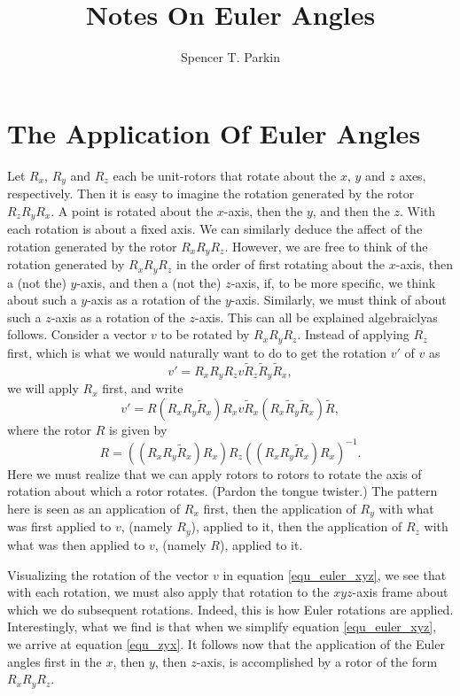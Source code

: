 \documentclass[12pt]{article}
\title{Notes On Euler Angles}
\author{Spencer T. Parkin}
\begin{document}
\maketitle

\section*{The Application Of Euler Angles}

Let $R_x$, $R_y$ and $R_z$ each be unit-rotors that rotate about the $x$, $y$ and $z$ axes, respectively.
Then it is easy to imagine the rotation generated by the rotor $R_zR_yR_x$.
A point is rotated about the $x$-axis, then the $y$, and then the $z$.  With each rotation is about
a fixed axis.  We can similarly deduce the affect of the rotation generated by the
rotor $R_xR_yR_z$.  However, we are free to think of the rotation generated by
$R_xR_yR_z$ in the order of first rotating about the $x$-axis, then a (not the) $y$-axis, and then
a (not the) $z$-axis, if, to be more specific, we think about such a $y$-axis as a rotation of the $y$-axis.
Similarly, we must think of about such a $z$-axis as a rotation of the $z$-axis.  This can all be explained
algebraiclyas follows.  Consider a vector $v$ to be rotated by $R_xR_yR_z$.  Instead of applying $R_z$
first, which is what we would naturally want to do to get the rotation $v'$ of $v$ as
\begin{equation}\label{equ_zyx}
v' = R_xR_yR_z v \tilde{R}_z\tilde{R}_y\tilde{R}_x,
\end{equation}
we will apply $R_x$ first, and write
\begin{equation}\label{equ_euler_xyz}
v' = R(R_x R_y \tilde{R}_x)R_x v \tilde{R}_x(R_x \tilde{R}_y \tilde{R}_x)\tilde{R},
\end{equation}
where the rotor $R$ is given by
\begin{equation*}
R = ((R_xR_y\tilde{R}_x)R_x)R_z((R_xR_y\tilde{R}_x)R_x)^{-1}.
\end{equation*}
Here we must realize that we can apply rotors to rotors to rotate the axis of rotation
about which a rotor rotates.  (Pardon the tongue twister.)  The pattern here is seen as an application of $R_x$ first,
then the application of $R_y$ with what was first applied to $v$, (namely $R_y$), applied to it,
then the application of $R_z$ with what was then applied to $v$, (namely $R$), applied to it.

Visualizing the rotation of the vector $v$ in equation \eqref{equ_euler_xyz}, we see that
with each rotation, we must also apply that rotation to the $xyz$-axis frame about which we do subsequent rotations.
Indeed, this is how Euler rotations are applied.  Interestingly, what we find is that when we
simplify equation \eqref{equ_euler_xyz}, we arrive at equation \eqref{equ_zyx}.
It follows now that the application of the Euler angles first in the $x$, then $y$, then $z$-axis,
is accomplished by a rotor of the form $R_xR_yR_z$.
\end{document}
